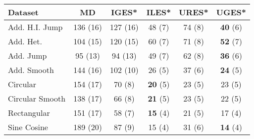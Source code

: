 \begin{tabular}{lccccc}
\toprule
Dataset & MD & IGES* & ILES* & URES* & UGES* \\
\midrule
Add. H.I. Jump & 136 (16) & 127 (16) & 48 (7) & 74 (8) & \textbf{40} (6) \\
Add. Het. & 104 (15) & 120 (15) & 60 (7) & 71 (8) & \textbf{52} (7) \\
Add. Jump & 95 (13) & 94 (13) & 49 (7) & 62 (8) & \textbf{36} (6) \\
Add. Smooth & 144 (16) & 102 (10) & 26 (5) & 37 (6) & \textbf{24} (5) \\
Circular & 154 (17) & 70 (8) & \textbf{20} (5) & 23 (5) & 23 (5) \\
Circular Smooth & 138 (17) & 66 (8) & \textbf{21} (5) & 23 (5) & 22 (5) \\
Rectangular & 151 (17) & 58 (7) & \textbf{15} (4) & 21 (5) & 17 (4) \\
Sine Cosine & 189 (20) & 87 (9) & 15 (4) & 31 (6) & \textbf{14} (4) \\
\bottomrule
\end{tabular}